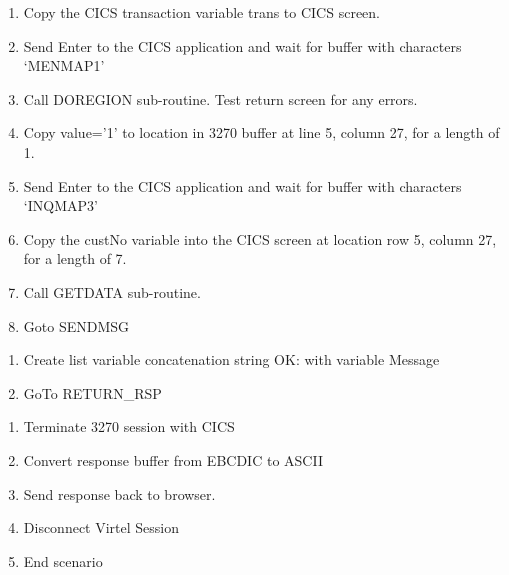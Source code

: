 \documentclass[letterpaper,10pt,english]{sphinxmanual}
\begin{document}
\begin{enumerate}
\def\theenumi{\arabic{enumi}}
\def\labelenumi{\theenumi .}
\makeatletter\def\p@enumii{\p@enumi \theenumi .}\makeatother
\item {} 
Copy the CICS transaction variable trans to CICS screen.

\item {} 
Send Enter to the CICS application and wait for buffer with characters ‘MENMAP1’

\item {} 
Call DOREGION sub-routine. Test return screen for any errors.

\item {} 
Copy value=’1’ to location in 3270 buffer at line 5, column 27, for a length of 1.

\item {} 
Send Enter to the CICS application and wait for buffer with characters ‘INQMAP3’

\item {} 
Copy the custNo variable into the CICS screen at location row 5, column 27, for a length of 7.

\item {} 
Call GETDATA sub-routine.

\item {} 
Goto SENDMSG

\end{enumerate}

\sphinxstylestrong{Label : SENDMSG \{Build OK response message{]}}
\begin{enumerate}
\def\theenumi{\arabic{enumi}}
\def\labelenumi{\theenumi .}
\makeatletter\def\p@enumii{\p@enumi \theenumi .}\makeatother
\item {} 
Create list variable concatenation string OK: with variable Message

\item {} 
GoTo RETURN\_RSP

\end{enumerate}

\begin{enumerate}
\def\theenumi{\arabic{enumi}}
\def\labelenumi{\theenumi .}
\makeatletter\def\p@enumii{\p@enumi \theenumi .}\makeatother
\item {} 
Terminate 3270 session with CICS

\item {} 
Convert response buffer from EBCDIC to ASCII

\item {} 
Send response back to browser.

\item {} 
Disconnect Virtel Session

\item {} 
End scenario

\end{enumerate}
\end{document}
